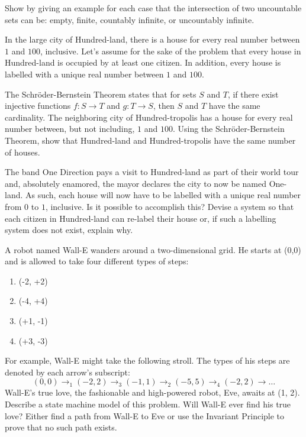 \documentclass[solution, letterpaper]{cs20}
\begin{document}

Show by giving an example for each case that the intersection of two uncountable sets can be: empty, finite, countably
infinite, or uncountably infinite.

In the large city of Hundred-land, there is a house for every real number between $1$ and $100$, inclusive. Let's assume for the sake of the problem that every house in Hundred-land is occupied by at least one citizen. In addition, every house is labelled with a unique real number between $1$ and $100$.

\subproblem The Schr\"{o}der-Bernstein Theorem states that for sets $S$ and $T$, if there exist injective functions $f : S \rightarrow T$ and $g : T \rightarrow S$, then $S$ and $T$ have the same cardinality. The neighboring city of Hundred-tropolis has a house for every real number between, but not including, $1$ and $100$. Using the Schr\"{o}der-Bernstein Theorem, show that Hundred-land and Hundred-tropolis have the same number of houses.

\subproblem The band One Direction pays a visit to Hundred-land as part of their world tour and, absolutely enamored, the mayor declares the city to now be named One-land. As such, each house will now have to be labelled with a unique real number from $0$ to $1$, inclusive. Is it possible to accomplish this? Devise a system so that each citizen in Hundred-land can re-label their house or, if such a labelling system does not exist, explain why.

A robot named Wall-E wanders around a two-dimensional grid. He starts at (0,0) and is allowed to take four different types of steps:
\begin{enumerate}
\item (-2, +2)
\item (-4, +4)
\item (+1, -1)
\item (+3, -3)
\end{enumerate}
For example, Wall-E might take the following stroll. The types of his steps are denoted by each arrow's subscript:
$$(0,0) \to_1 (-2,2) \to_3 (-1,1) \to_2 (-5,5) \to_4 (-2,2) \to \ldots$$
Wall-E's true love, the fashionable and high-powered robot, Eve, awaits at (1, 2).
\subproblem Describe a state machine model of this problem.
\subproblem Will Wall-E ever find his true love? Either find a path from Wall-E to Eve or use the Invariant Principle to prove that no such path exists.
\end{document}
